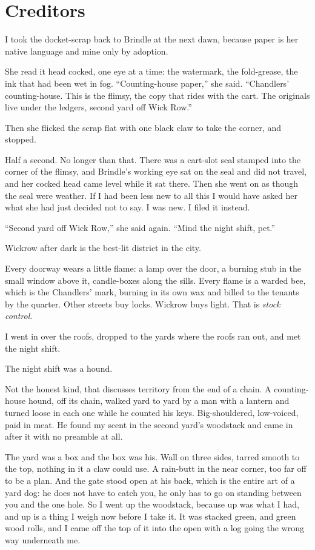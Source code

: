 \chapter{Creditors}

I took the docket-scrap back to Brindle at the next dawn, because paper is her native language and mine only by adoption.

She read it head cocked, one eye at a time: the watermark, the fold-grease, the ink that had been wet in fog. ``Counting-house paper,'' she said. ``Chandlers' counting-house. This is the flimsy, the copy that rides with the cart. The originals live under the ledgers, second yard off Wick Row.''

Then she flicked the scrap flat with one black claw to take the corner, and stopped.

Half a second. No longer than that. There was a cart-slot seal stamped into the corner of the flimsy, and Brindle's working eye sat on the seal and did not travel, and her cocked head came level while it sat there. Then she went on as though the seal were weather. If I had been less new to all this I would have asked her what she had just decided not to say. I was new. I filed it instead.

``Second yard off Wick Row,'' she said again. ``Mind the night shift, pet.''

\scenebreak

Wickrow after dark is the best-lit district in the city.

Every doorway wears a little flame: a lamp over the door, a burning stub in the small window above it, candle-boxes along the sills. Every flame is a warded bee, which is the Chandlers' mark, burning in its own wax and billed to the tenants by the quarter. Other streets buy locks. Wickrow buys light. That is \emph{stock control}.

I went in over the roofs, dropped to the yards where the roofs ran out, and met the night shift.

The night shift was a hound.

Not the honest kind, that discusses territory from the end of a chain. A counting-house hound, off its chain, walked yard to yard by a man with a lantern and turned loose in each one while he counted his keys. Big-shouldered, low-voiced, paid in meat. He found my scent in the second yard's woodstack and came in after it with no preamble at all.

The yard was a box and the box was his. Wall on three sides, tarred smooth to the top, nothing in it a claw could use. A rain-butt in the near corner, too far off to be a plan. And the gate stood open at his back, which is the entire art of a yard dog: he does not have to catch you, he only has to go on standing between you and the one hole. So I went up the woodstack, because up was what I had, and up is a thing I weigh now before I take it. It was stacked green, and green wood rolls, and I came off the top of it into the open with a log going the wrong way underneath me.

